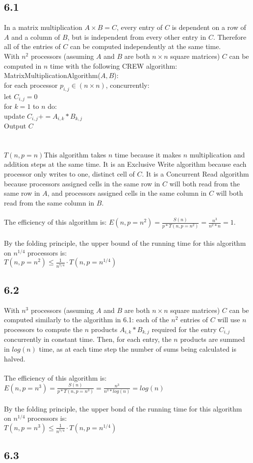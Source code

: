 \documentclass[letterpaper,notitlepage,twoside]{article}
\newcommand\tab[1][1cm]{\hspace*{#1}} %
\begin{document}
\subsection*{6.1}
In a matrix multiplication $A \times B = C$, every entry of $C$ is dependent on a row of $A$ and a column of $B$, but is independent from every other entry in $C$. Therefore all of the entries of $C$ can be computed independently at the same time.\\
With $n^2$ processors (assuming $A$ and $B$ are both $n \times n$ square matrices) $C$ can be computed in $n$ time with the following CREW algorithm:\\
MatrixMultiplicationAlgorithm($A, B$):\\
\tab for each processor $p_{i, j} \in (n \times n)$, concurrently:\\
\tab\tab let $C_{i, j} = 0$\\
\tab\tab for $k = 1$ to $n$ do: \\
\tab\tab\tab update $C_{i, j} += A_{i, k} * B_{k, j}$\\
\tab Output $C$\\
\\\\
$T(n, p=n)$This algorithm takes $n$ time because it makes $n$ multiplication and addition steps at the same time. It is an Exclusive Write algorithm because each processor only writes to one, distinct cell of $C$. It is a Concurrent Read algorithm because processors assigned cells in the same row in $C$ will both read from the same row in $A$, and processors assigned cells in the same column in $C$ will both read from the same column in $B$.
\\\\
The efficiency of this algorithm is: $E(n, p = n^2) = \frac{S(n)}{p * T(n, p = n^2)} = \frac{n^3}{n^2 * n} = 1$.
\\\\
By the folding principle, the upper bound of the running time for this algorithm on $n^{1/4}$ processors is:\\ 
$T(n, p = n^2) \leq \frac{1}{n^{7/4}} \cdot T(n, p = n^{1/4})$

\subsection*{6.2}
With $n^3$ processors (assuming $A$ and $B$ are both $n \times n$ square matrices) $C$ can be computed similarly to the algorithm in 6.1: each of the $n^2$ entries of $C$ will use $n$ processors to compute the $n$ products $A_{i, k} * B_{k, j}$ required for the entry $C_{i, j}$ concurrently in constant time. Then, for each entry,  the $n$ products are summed in $log(n)$ time, as at each time step the number of sums being calculated is halved.  \\\\
The efficiency of this algorithm is: $E(n, p=n^3) = \frac{S(n)}{p * T(n, p = n^3)} = \frac{n^3}{n^3 * log(n)} = log(n)$\\\\
By the folding principle, the upper bond of the running time for this algorithm on $n^{1/4}$ processors is:\\
$T(n, p = n^3) \leq \frac{1}{n^{7/4}} \cdot T(n, p = n^{1/4})$

\subsection*{6.3}
\end{document}
